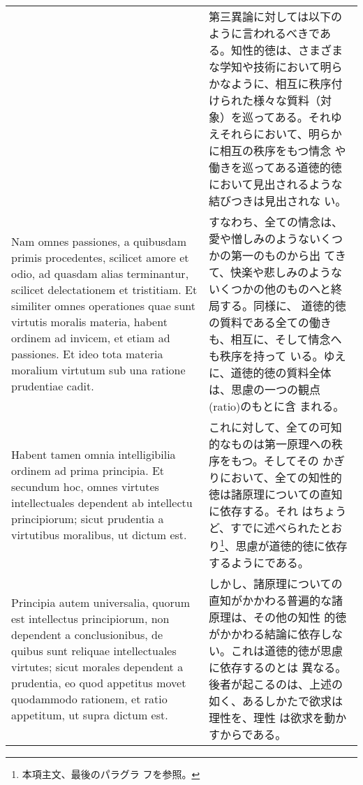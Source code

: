 \documentclass[10pt]{jsarticle}
\begin{document}
\begin{longtable}{p{21em}p{21em}}
&

第三異論に対しては以下のように言われるべきである。知性的徳は、さまざま
な学知や技術において明らかなように、相互に秩序付けられた様々な質料（対
象）を巡ってある。それゆえそれらにおいて、明らかに相互の秩序をもつ情念
や働きを巡ってある道徳的徳において見出されるような結びつきは見出されな
い。
 
\\

 Nam omnes passiones, a quibusdam primis procedentes, scilicet amore
et odio, ad quasdam alias terminantur, scilicet delectationem et
tristitiam. Et similiter omnes operationes quae sunt virtutis moralis
materia, habent ordinem ad invicem, et etiam ad passiones. Et ideo
tota materia moralium virtutum sub una ratione prudentiae cadit.


&

 すなわち、全ての情念は、愛や憎しみのようないくつかの第一のものから出
 てきて、快楽や悲しみのようないくつかの他のものへと終局する。同様に、
 道徳的徳の質料である全ての働きも、相互に、そして情念へも秩序を持って
 いる。ゆえに、道徳的徳の質料全体は、思慮の一つの観点(ratio)のもとに含
 まれる。

\\



 Habent tamen omnia intelligibilia ordinem ad prima principia. Et
secundum hoc, omnes virtutes intellectuales dependent ab intellectu
principiorum; sicut prudentia a virtutibus moralibus, ut dictum est.


&

 これに対して、全ての可知的なものは第一原理への秩序をもつ。そしてその
 かぎりにおいて、全ての知性的徳は諸原理についての直知に依存する。それ
 はちょうど、すでに述べられたとおり\footnote{本項主文、最後のパラグラ
 フを参照。}、思慮が道徳的徳に依存するようにである。

\\

 Principia autem universalia, quorum est intellectus principiorum, non
dependent a conclusionibus, de quibus sunt reliquae intellectuales
virtutes; sicut morales dependent a prudentia, eo quod appetitus movet
quodammodo rationem, et ratio appetitum, ut supra dictum est.

&

 しかし、諸原理についての直知がかかわる普遍的な諸原理は、その他の知性
 的徳がかかわる結論に依存しない。これは道徳的徳が思慮に依存するのとは
 異なる。後者が起こるのは、上述の如く、あるしかたで欲求は理性を、理性
 は欲求を動かすからである。


\end{longtable}
\end{document}
